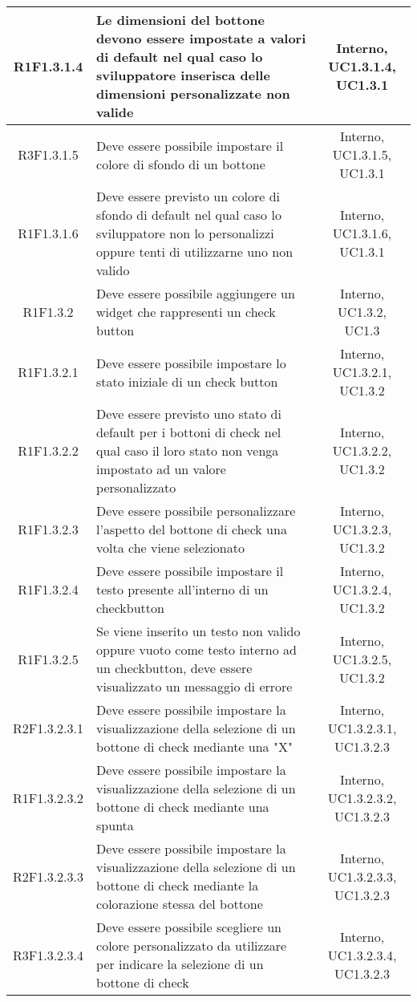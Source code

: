 \begin{longtable}{|c|>{\centering}m{7cm}|c|}
			\hline
			R1F1.3.1.4 & Le dimensioni del bottone devono essere impostate a valori di default nel qual caso lo sviluppatore inserisca delle dimensioni personalizzate non valide & Interno, UC1.3.1.4, UC1.3.1 \\
			\hline
			R3F1.3.1.5 & Deve essere possibile impostare il colore di sfondo di un bottone & Interno, UC1.3.1.5, UC1.3.1 \\
			\hline
			R1F1.3.1.6 & Deve essere previsto un colore di sfondo di default nel qual caso lo sviluppatore non lo personalizzi oppure tenti di utilizzarne uno non valido & Interno, UC1.3.1.6, UC1.3.1 \\
			\hline
			R1F1.3.2 & Deve essere possibile aggiungere un widget che rappresenti un check button & Interno, UC1.3.2, UC1.3 \\
			\hline
			R1F1.3.2.1 & Deve essere possibile impostare lo stato iniziale di un check button & Interno, UC1.3.2.1, UC1.3.2 \\
		\hline
		R1F1.3.2.2 & Deve essere previsto uno stato di default per i bottoni di check nel qual caso il loro stato non venga impostato ad un valore personalizzato & Interno, UC1.3.2.2, UC1.3.2 \\
		\hline
		R1F1.3.2.3 & Deve essere possibile personalizzare l'aspetto del bottone di check una volta che viene selezionato & Interno, UC1.3.2.3, UC1.3.2 \\
		\hline
		R1F1.3.2.4 & Deve essere possibile impostare il testo presente all'interno di un checkbutton & Interno, UC1.3.2.4, UC1.3.2 \\
		\hline
		R1F1.3.2.5 & Se viene inserito un testo non valido oppure vuoto come testo interno ad un checkbutton, deve essere visualizzato un messaggio di errore & Interno, UC1.3.2.5, UC1.3.2 \\
		\hline
		R2F1.3.2.3.1 & Deve essere possibile impostare la visualizzazione della selezione di un bottone di check mediante una "X" & Interno, UC1.3.2.3.1, UC1.3.2.3 \\ 
		\hline
		R1F1.3.2.3.2 & Deve essere possibile impostare la visualizzazione della selezione di un bottone di check mediante una spunta & Interno, UC1.3.2.3.2, UC1.3.2.3 \\ 
		\hline
		R2F1.3.2.3.3 & Deve essere possibile impostare la visualizzazione della selezione di un bottone di check mediante la colorazione stessa del bottone & Interno, UC1.3.2.3.3, UC1.3.2.3 \\ 
		\hline
		R3F1.3.2.3.4 & Deve essere possibile scegliere un colore personalizzato da utilizzare per indicare la selezione di un bottone di check & Interno, UC1.3.2.3.4, UC1.3.2.3 \\ 

\end{longtable}
